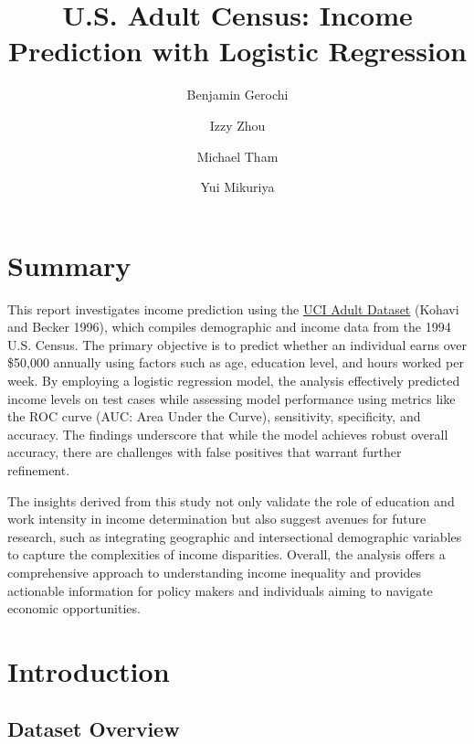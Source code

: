 \documentclass[
  letterpaper,
  DIV=11,
  numbers=noendperiod]{scrartcl}
\title{U.S. Adult Census: Income Prediction with Logistic Regression}
\author{Benjamin Gerochi \and Izzy Zhou \and Michael Tham \and Yui
Mikuriya}
\date{}
\renewcommand*\contentsname{Table of contents}
\newcommand\contentsname{Table of contents}
\begin{document}
\maketitle
\ifdefined\Shaded\renewenvironment{Shaded}{\begin{tcolorbox}[enhanced, frame hidden, borderline west={3pt}{0pt}{shadecolor}, sharp corners, interior hidden, boxrule=0pt, breakable]}{\end{tcolorbox}}\fi

\renewcommand*\contentsname{Table of contents}
{
\hypersetup{linkcolor=}
\setcounter{tocdepth}{3}
\tableofcontents
}
\hypertarget{summary}{%
\section{Summary}\label{summary}}

This report investigates income prediction using the
\href{https://archive.ics.uci.edu/dataset/2/adult}{UCI Adult Dataset}
(Kohavi and Becker 1996), which compiles demographic and income data
from the 1994 U.S. Census. The primary objective is to predict whether
an individual earns over \$50,000 annually using factors such as age,
education level, and hours worked per week. By employing a logistic
regression model, the analysis effectively predicted income levels on
test cases while assessing model performance using metrics like the ROC
curve (AUC: Area Under the Curve), sensitivity, specificity, and
accuracy. The findings underscore that while the model achieves robust
overall accuracy, there are challenges with false positives that warrant
further refinement.

The insights derived from this study not only validate the role of
education and work intensity in income determination but also suggest
avenues for future research, such as integrating geographic and
intersectional demographic variables to capture the complexities of
income disparities. Overall, the analysis offers a comprehensive
approach to understanding income inequality and provides actionable
information for policy makers and individuals aiming to navigate
economic opportunities.

\hypertarget{introduction}{%
\section{Introduction}\label{introduction}}

\hypertarget{dataset-overview}{%
\subsection{Dataset Overview}\label{dataset-overview}}
\end{document}
